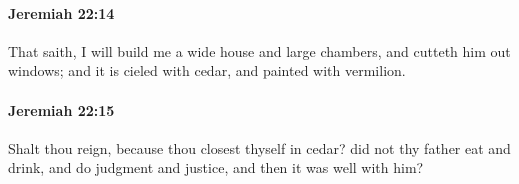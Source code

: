 		\paragraph{Jeremiah 22:14} %
			\label{JEREMIAH-22-14}

			That saith, I will build me a wide house and large chambers, and cutteth him out windows; and it is cieled with cedar, and painted with vermilion.


		\paragraph{Jeremiah 22:15} %
			\label{JEREMIAH-22-15}

			Shalt thou reign, because thou closest thyself in cedar? did not thy father eat and drink, and do judgment and justice, and then it was well with him?


